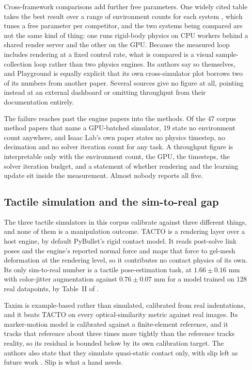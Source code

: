 Cross-framework comparisons add further free parameters. One widely cited table takes the best
result over a range of environment counts for each system \cite[Table~1a]{maniskill2_2023}, which
tunes a free parameter per competitor, and the two systems being compared are not the same kind of
thing: one runs rigid-body physics on CPU workers behind a shared render server and the other on
the GPU. Because the measured loop includes rendering at a fixed control rate, what is compared is
a visual sample-collection loop rather than two physics engines. Its authors say so themselves, and
Playground is equally explicit that its own cross-simulator plot borrows two of its numbers from
another paper. Several sources give no figure at all, pointing instead at an external dashboard or
omitting throughput from their documentation entirely.

The failure reaches past the engine papers into the methods. Of the 47 corpus method papers that
name a GPU-batched simulator, 19 state no environment count anywhere, and Isaac Lab's own paper
states no physics timestep, no decimation and no solver iteration count for any task. A throughput
figure is interpretable only with the environment count, the GPU, the timesteps, the solver
iteration budget, and a statement of whether rendering and the learning update sit inside the
measurement. Almost nobody reports all five.

\subsection{Tactile simulation and the sim-to-real gap}
\label{sec:sim:tactile}

The three tactile simulators in this corpus calibrate against three different things, and none of
them is a manipulation outcome. TACTO is a rendering layer over a host engine, by default
PyBullet's rigid contact model. It reads post-solve link poses and the engine's reported normal
force and maps that force to gel-mesh deformation at the rendering level, so it contributes no
contact physics of its own. Its only sim-to-real number is a tactile pose-estimation task, at
$1.66 \pm 0.16$ mm with color-jitter augmentation against $0.76 \pm 0.07$ mm for a model trained
on 128 real datapoints, by Table~II of \cite{tacto_2020}.

Taxim is example-based rather than simulated, calibrated from real indentations, and it beats
TACTO on every optical-similarity metric against real images. Its marker-motion model is calibrated
against a finite-element reference, and it tracks that reference about three times more tightly
than the reference tracks reality, so its residual is bounded below by its own calibration target.
The authors also state that they simulate quasi-static contact only, with slip left as future work
\cite[Sec.~V]{taxim_2021}. Slip is what a hand needs.

